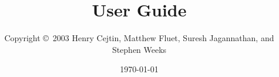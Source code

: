 \documentclass[12pt]{article}
\title{{\mlton} User Guide}
\author{Copyright \copyright\ 2003 Henry Cejtin, Matthew Fluet, Suresh
Jagannathan, and Stephen Weeks}
\date{\today}
\begin{document}
\maketitle


\begin{latexonly}
\tableofcontents
\end{latexonly}




%












\appendix

\end{document}
